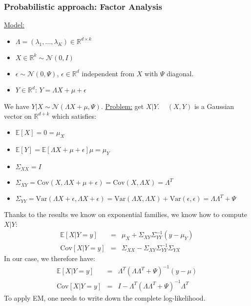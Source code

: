 \documentclass[12pt,a4paper]{report}
\begin{document}
\subsubsection{Probabilistic approach: Factor Analysis}
\underline{Model:}
\begin{itemize}
\item $\Lambda = (\lambda_1, \ldots, \lambda_K) \in \mathbb{R}^{d\times k}$
\item $X \in \mathbb{R}^{k} \sim \mathcal{N}(0,I)$
\item $\epsilon \sim \mathcal{N}(0,\Psi)$, $\epsilon \in \mathbb{R}^{d}$ independent from $X$ with $\Psi$ diagonal.
\item $Y \in \mathbb{R}^{d}$: $Y = \Lambda X + \mu + \epsilon$
\end{itemize}
We have $Y|X \sim \mathcal{N}(\Lambda X + \mu, \Psi)$.
\newline
\underline{Problem:} get $X | Y$.
\newline~\newline
$(X,Y)$ is a Gaussian vector on $\mathbb{R}^{d+k}$ which satisfies:
\begin{itemize}
\item $\mathbb{E}[X] = 0 = \mu_X$
\item $\mathbb{E}[Y] = \mathbb{E}[\Lambda X + \mu + \epsilon] \mu = \mu_Y$
\item $\Sigma_{XX}=I$
\item $\Sigma_{XY} = \mathrm{Cov}(X,\Lambda X + \mu + \epsilon) = \mathrm{Cov}(X,\Lambda X)= \Lambda^{T}$
\item $\Sigma_{YY} = \mathrm{Var}(\Lambda X + \epsilon, \Lambda X +\epsilon) =\mathrm{Var}(\Lambda X, \Lambda X) + \mathrm{Var}(\epsilon,\epsilon) = \Lambda\Lambda^{T} + \Psi$
\end{itemize}
Thanks to the results we know on exponential families, we know how to compute $X|Y$:
\begin{eqnarray*}
\mathbb{E}[X|Y=y]&=&\mu_X + \Sigma_{XY}\Sigma_{YY}^{-1}(y-\mu_Y)\\
\mathrm{Cov}[X|Y=y]&=&\Sigma_{XX} - \Sigma_{XY}\Sigma_{YY}^{-1}\Sigma_{YX}
\end{eqnarray*}
In our case, we therefore have:
\begin{eqnarray*}
\mathbb{E}[X|Y=y]&=&\Lambda^{T}(\Lambda\Lambda^{T} + \Psi)^{-1}(y-\mu)\\
\mathrm{Cov}[X|Y=y]&=&I - \Lambda^{T}(\Lambda\Lambda^{T} + \Psi)^{-1}\Lambda^{T}
\end{eqnarray*}
To apply EM, one needs to write down the complete log-likelihood.
\end{document}
